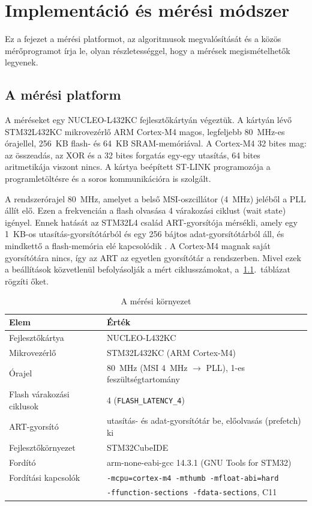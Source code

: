 \documentclass[a4paper,12pt]{report}
\theoremstyle{definition}
\theoremstyle{remark}
\begin{document}
\chapter{Implementáció és mérési módszer}\label{chap:implementacio}

Ez a fejezet a mérési platformot, az algoritmusok megvalósítását és a közös mérőprogramot írja le, olyan részletességgel, hogy a mérések megismételhetők legyenek.

\section{A mérési platform}\label{sec:platform}

A méréseket egy NUCLEO-L432KC fejlesztőkártyán végeztük. A kártyán lévő STM32L432KC mikrovezérlő ARM Cortex-M4 magos, legfeljebb 80~MHz-es órajellel, 256~KB flash- és 64~KB SRAM-memóriával. A Cortex-M4 32 bites mag: az összeadás, az XOR és a 32 bites forgatás egy-egy utasítás, 64 bites aritmetikája viszont nincs. A kártya beépített ST-LINK programozója a programletöltésre és a soros kommunikációra is szolgált.

A rendszerórajel 80~MHz, amelyet a belső MSI-oszcillátor (4~MHz) jeléből a PLL állít elő. Ezen a frekvencián a flash olvasása 4 várakozási ciklust (wait state) igényel. Ennek hatását az STM32L4 család ART-gyorsítója mérsékli, amely egy 1~KB-os utasítás-gyorsítótárból és egy 256 bájtos adat-gyorsítótárból áll, és mindkettő a flash-memória elé kapcsolódik \cite{RM0394}. A Cortex-M4 magnak saját gyorsítótára nincs, így az ART az egyetlen gyorsítótár a rendszerben. Mivel ezek a beállítások közvetlenül befolyásolják a mért ciklusszámokat, a~\ref{tab:platform}.~táblázat rögzíti őket.

\begin{table}[htbp]
	\centering
	\small
	\caption{A mérési környezet}
	\label{tab:platform}
	\begin{tabular}{|l|l|}
		\hline
		\textbf{Elem} & \textbf{Érték} \\ \hline
		Fejlesztőkártya & NUCLEO-L432KC \\ \hline
		Mikrovezérlő & STM32L432KC (ARM Cortex-M4) \\ \hline
		Órajel & 80~MHz (MSI 4~MHz $\rightarrow$ PLL), 1-es feszültségtartomány \\ \hline
		Flash várakozási ciklusok & 4 (\texttt{FLASH\_LATENCY\_4}) \\ \hline
		ART-gyorsító & utasítás- és adat-gyorsítótár be, előolvasás (prefetch) ki \\ \hline
		Fejlesztőkörnyezet & STM32CubeIDE %
		\\ \hline
		Fordító & arm-none-eabi-gcc 14.3.1 (GNU Tools for STM32) \\ \hline
		Fordítási kapcsolók & \texttt{-mcpu=cortex-m4 -mthumb -mfloat-abi=hard} \\
		& \texttt{-ffunction-sections -fdata-sections}, C11 \\ \hline
	\end{tabular}
\end{table}
\end{document}
